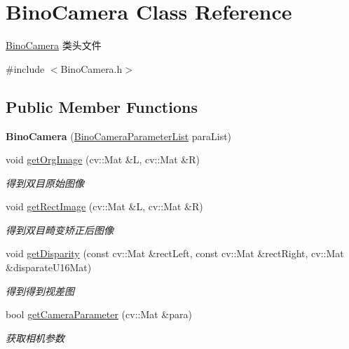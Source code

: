 \hypertarget{classBinoCamera}{}\section{Bino\+Camera Class Reference}
\label{classBinoCamera}


\hyperlink{classBinoCamera}{Bino\+Camera} 类头文件  




{\ttfamily \#include $<$Bino\+Camera.\+h$>$}

\subsection*{Public Member Functions}
\begin{DoxyCompactItemize}
\item 
{\bfseries Bino\+Camera} (\hyperlink{structBinoCameraParameterList}{Bino\+Camera\+Parameter\+List} para\+List)\hypertarget{classBinoCamera_a6fd6ce57220e1d4bd1dcfa2a72d7014c}{}\label{classBinoCamera_a6fd6ce57220e1d4bd1dcfa2a72d7014c}

\item 
void \hyperlink{classBinoCamera_a7e675afbd9b11a855b8816abe413f51b}{get\+Org\+Image} (cv\+::\+Mat \&L, cv\+::\+Mat \&R)
\begin{DoxyCompactList}\small\item\em 得到双目原始图像 \end{DoxyCompactList}\item 
void \hyperlink{classBinoCamera_a0ca8fdc7baebb847cec029094a1308d8}{get\+Rect\+Image} (cv\+::\+Mat \&L, cv\+::\+Mat \&R)
\begin{DoxyCompactList}\small\item\em 得到双目畸变矫正后图像 \end{DoxyCompactList}\item 
void \hyperlink{classBinoCamera_ac9e29c484ef2a61ce42e8c3dfa41b714}{get\+Disparity} (const cv\+::\+Mat \&rect\+Left, const cv\+::\+Mat \&rect\+Right, cv\+::\+Mat \&disparate\+U16\+Mat)
\begin{DoxyCompactList}\small\item\em 得到得到视差图 \end{DoxyCompactList}\item 
bool \hyperlink{classBinoCamera_a7dc100e891a67b59295e79b93241e16f}{get\+Camera\+Parameter} (cv\+::\+Mat \&para)
\begin{DoxyCompactList}\small\item\em 获取相机参数 \end{DoxyCompactList}\end{DoxyCompactItemize}


